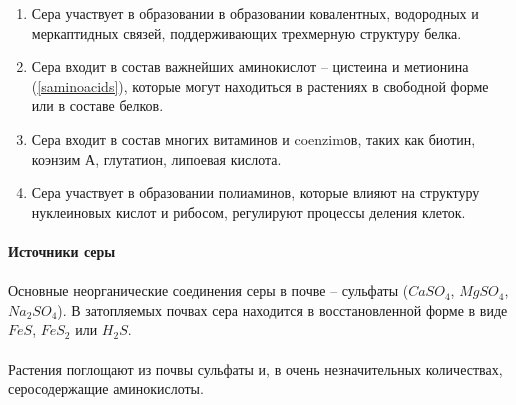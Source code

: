 \begin{enumerate}

\item Сера участвует в образовании в образовании ковалентных, водородных и меркаптидных связей, поддерживающих трехмерную структуру белка.  

\item Сера входит в состав важнейших аминокислот -- цистеина и метионина (\ris \ref{saminoacids}), которые могут находиться в растениях в свободной форме или в составе белков.  
\item Сера входит в состав многих витаминов и \gls{coenzim}ов, таких как биотин, коэнзим А, глутатион, липоевая кислота.  
\item Сера участвует в образовании полиаминов, которые влияют на структуру нуклеиновых кислот и рибосом, регулируют процессы деления клеток. 

\end{enumerate}

\paragraph*{Источники серы}

\paragraph*{}Основные неорганические соединения серы в почве -- сульфаты ($CaSO_{4}$, $MgSO_{4}$, $Na_{2}SO_{4}$). В затопляемых почвах сера находится в восстановленной форме в виде $FeS$, $FeS_{2}$ или $H_{2}S$. 

\paragraph*{}Растения поглощают из почвы сульфаты и, в очень незначительных количествах, серосодержащие аминокислоты. 

